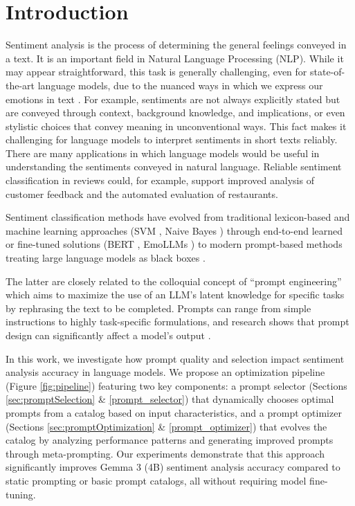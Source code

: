 \documentclass{article}
\theoremstyle{plain}
\theoremstyle{definition}
\theoremstyle{remark}
\begin{document}
\section{Introduction}
Sentiment analysis is the process of determining the general feelings conveyed in a text. It is an important field in Natural Language Processing (NLP). While it may appear straightforward, this task is generally challenging, even for state-of-the-art language models, due to the nuanced ways in which we express our emotions in text \cite{zhang-etal-2024-sentiment}. For example, sentiments are not always explicitly stated but are conveyed through context, background knowledge, and implications, or even stylistic choices that convey meaning in unconventional ways. This fact makes it challenging for language models to interpret sentiments in short texts reliably. 
There are many applications in which language models would be useful in understanding the sentiments conveyed in natural language. Reliable sentiment classification in reviews could, for example, support improved analysis of customer feedback \cite{traditionalSA} and the automated evaluation of restaurants.

Sentiment classification methods have evolved from traditional lexicon-based and machine learning approaches (SVM \cite{svm}, Naive Bayes \cite{traditionalSA}) through end-to-end learned or fine-tuned solutions (BERT \cite{bert, bertsentiment}, EmoLLMs \cite{emollms}) to modern prompt-based methods treating large language models as black boxes \cite{promptlearning, zhang-etal-2024-sentiment}.

The latter are closely related to the colloquial concept of ``prompt engineering'' \cite{promptengineering} which aims to maximize the use of an LLM's latent knowledge for specific tasks by rephrasing the text to be completed. Prompts can range from simple instructions to highly task-specific formulations, and research shows that prompt design can significantly affect a model's output \cite{brown2020languagemodelsfewshotlearners}. 

In this work, we investigate how prompt quality and selection impact sentiment analysis accuracy in language models. We propose an optimization pipeline (Figure \ref{fig:pipeline}) featuring two key components: a prompt selector (Sections \ref{sec:promptSelection} \& \ref{prompt_selector}) that dynamically chooses optimal prompts from a catalog based on input characteristics, and a prompt optimizer (Sections \ref{sec:promptOptimization} \& \ref{prompt_optimizer}) that evolves the catalog by analyzing performance patterns and generating improved prompts through meta-prompting. Our experiments demonstrate that this approach significantly improves Gemma 3 (4B) \cite{gemma_2025} sentiment analysis accuracy compared to static prompting or basic prompt catalogs, all without requiring model fine-tuning.
\end{document}
